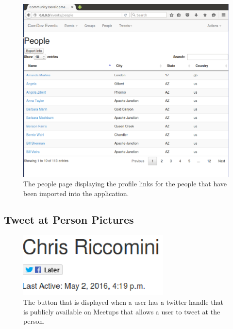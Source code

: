 \documentclass[draftclsnofoot,10pt,onecolumn]{IEEEtran} %
\begin{document}
\begin{figure}[H]
  \begin{center}
	\includegraphics[width=5in, frame]{peoplePage}
	\captionsetup{width=.4\linewidth}
	\centering
  \caption{The people page displaying the profile links for the people that have been imported into the application.}
  \end{center}
\end{figure}

\subsection{Tweet at Person Pictures}

\begin{figure}[H]
  \begin{center}
  \includegraphics[width=3in, frame]{tweet_person1}
  	\captionsetup{width=.4\linewidth}
  \centering
  \caption{The button that is displayed when a user has a twitter handle that is publicly available on Meetups that allows a user to tweet at the person.}

  \end{center}
\end{figure}
\end{document}
